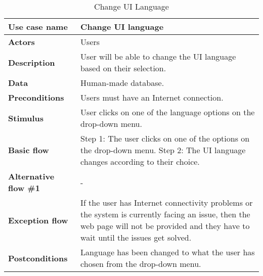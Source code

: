 \documentclass[listof=nochaptergap]{report}
\begin{document}
    \begin{table}[H]
        \centering
         \begin{tabular}{| p{4cm} | p{10cm} |} 
         \hline
         \textbf{Use case name} & Change UI language \\
         \hline
         \textbf{Actors} & Users \\
         \hline
         \textbf{Description} & User will be able to change the UI language based on their selection. \\
         \hline
         \textbf{Data} &  Human-made database.\\
         \hline
         \textbf{Preconditions} & Users must have an Internet connection. \\
         \hline
         \textbf{Stimulus} & User clicks on one of the language options on the drop-down menu. \\
         \hline
         \textbf{Basic flow} & Step 1: The user clicks on one of the options on the drop-down menu. \newline Step 2: The UI language changes according to their choice. \\
         \hline
         \textbf{Alternative flow \#1} & - \\
         \hline
         \textbf{Exception flow} & If the user has Internet connectivity problems or the system is currently facing an issue, then the web page will not be provided and they have to wait until the issues get solved. \\
         \hline
         \textbf{Postconditions} & Language has been changed to what the user has chosen from the drop-down menu. \\
         \hline
         \end{tabular}
        \caption{Change UI Language}
        \label{tab:table5}
    \end{table}
\end{document}
